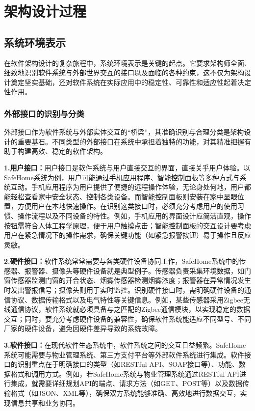 \section{架构设计过程}

\subsection{系统环境表示}

在软件架构设计的复杂旅程中，系统环境表示是关键的起点。它要求架构师全面、细致地识别软件系统与外部世界交互的接口以及面临的各种约束，这不仅为架构设计奠定坚实基础，还对软件系统在实际应用中的稳定性、可靠性和适应性起着决定性作用。

\subsubsection{外部接口的识别与分类}

外部接口作为软件系统与外部实体交互的``桥梁''，其准确识别与合理分类是架构设计的重要基石。不同类型的外部接口在系统中承担着独特的功能，对其精准把握有助于构建高效、稳定的软件架构。

\textbf{1.用户接口：}用户接口是软件系统与用户直接交互的界面，直接关乎用户体验。以SafeHome系统为例，用户可能通过手机应用程序、智能控制面板等多种方式与系统互动。手机应用程序为用户提供了便捷的远程操作体验，无论身处何地，用户都能轻松查看家中安全状态、控制各类设备。而智能控制面板则安装在家中显眼位置，方便用户在本地快速操作。在识别这类接口时，必须充分考虑用户的使用习惯、操作流程以及不同设备的特性。例如，手机应用的界面设计应简洁直观，操作按钮需符合人体工程学原理，便于用户触摸点击；智能控制面板的交互设计要考虑用户在紧急情况下的操作需求，确保关键功能（如紧急报警按钮）易于操作且反应灵敏。

\textbf{2.硬件接口：}软件系统常常需要与各类硬件设备协同工作，SafeHome系统中的传感器、报警器、摄像头等硬件设备就是典型例子。传感器负责采集环境数据，如门窗传感器监测门窗的开合状态、烟雾传感器检测烟雾浓度；报警器在异常情况发生时发出警报信号；摄像头则用于实时监控。识别硬件接口时，需明确硬件设备的通信协议、数据传输格式以及电气特性等关键信息。例如，某些传感器采用Zigbee无线通信协议，软件系统就必须具备与之匹配的Zigbee通信模块，以实现稳定的数据交互；同时，要充分考虑硬件设备的兼容性，确保软件系统能适应不同型号、不同厂家的硬件设备，避免因硬件差异导致的系统故障。

\textbf{3.软件接口：}在现代软件生态系统中，软件系统之间的交互日益频繁。SafeHome系统可能需要与物业管理系统、第三方支付平台等外部软件系统进行集成。软件接口的识别重点在于明确接口的类型（如RESTful API、SOAP接口等）、功能、数据格式和调用方式。例如，若SafeHome系统与物业管理系统通过RESTful API进行集成，就需要详细规划API的端点、请求方法（如GET、POST等）以及数据传输格式（如JSON、XML等），确保双方系统能够准确、高效地进行数据交互，实现信息共享和业务协同。

